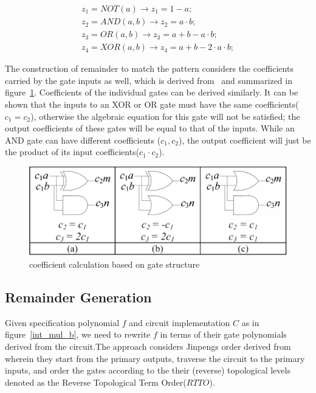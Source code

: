 \documentclass{article}
\begin{document}
\begin{gather*}
z_1 = NOT(a) \rightarrow z_1 = 1-a;\\
z_2 = AND(a,b) \rightarrow z_2 = a\cdot b;\\
z_3 = OR(a,b) \rightarrow z_3= a+b-a\cdot b;\\
z_4 = XOR(a,b) \rightarrow z_4 = a+b-2\cdot a\cdot b;
\end{gather*}

The construction of remainder to match the pattern considers the coefficients carried by the gate inputs as well, which is derived from~\cite{maciej:2015:2} and summarized in figure~\ref{coeff_calc}. Coefficients of the individual gates can be derived similarly. It can be shown that the inputs to an XOR or OR gate must have the same coefficients($c_1=c_2$), otherwise the algebraic equation for this gate will not be satisfied; the output coefficients of these gates will be equal to that of the inputs. While an AND gate can have different coefficients ($c_1,c_2$), the output coefficient will just be the product of its input coefficients($c_1\cdot c_2$).

\begin{figure}[ht]
	\begin{center}
	\includegraphics[scale = 0.29]{coeff_calc}
	\end{center}
	\vspace{-4ex}
	\caption{coefficient calculation based on gate structure}
	\label{coeff_calc}
	\vspace{-2ex}
\end{figure}

\subsection{Remainder Generation}
Given specification polynomial $f$ and circuit implementation $C$ as in figure~\ref{int_mul_b}, we need to rewrite $f$ in terms of their gate polynomials derived from the circuit.The approach considers Jinpengs order derived from \cite{lv} wherein they start from the primary outputs, traverse the circuit to the primary inputs, and order the gates according to the their (reverse) topological levels denoted as the Reverse Topological Term Order($RTTO$). 
\end{document}
